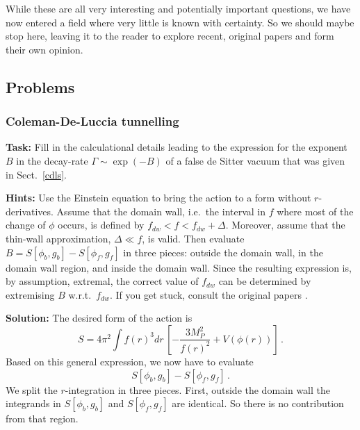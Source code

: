 \documentclass[12pt]{article}
\newcommand{\be}{\begin{equation}}
\newcommand{\ee}{\end{equation}}
\numberwithin{equation}{section}
\begin{document}
While these are all very interesting and potentially important questions, we have now entered a field where very little is known with certainty. So we should maybe stop here, leaving it to the reader to explore recent, original papers and form their own opinion.

\subsection{Problems}
\subsubsection{Coleman-De-Luccia tunnelling}\label{cdlp}

{\bf Task:} Fill in the calculational details leading to the expression for the exponent $B$ in the decay-rate $\Gamma\sim \exp(-B)$ of a false de Sitter vacuum that was given in Sect.~\ref{cdls}.

\noindent
{\bf Hints:} Use the Einstein equation to bring the action to a form without $r$-derivatives. Assume that the domain wall, i.e.~the interval in $f$ where most of the change of $\phi$ occurs, is defined by $f_{dw}<f<f_{dw}+\Delta$. Moreover, assume that the thin-wall approximation, $\Delta\ll f$, is valid. Then evaluate $B=S[\phi_b,g_b]-S[\phi_f,g_f]$ in three pieces: outside the  domain wall, in the domain wall region, and inside the domain wall. Since the resulting expression is, by assumption, extremal, the correct value of $f_{dw}$ can be determined by extremising $B$ w.r.t.~$f_{dw}$. If you get stuck, consult the original papers \cite{Coleman:1980aw, Parke:1982pm, Johnson:2007jla}.

\noindent
{\bf Solution:}
The desired form of the action is
\be
S = 4\pi^2 \int f(r)^3 dr\,\left[-\frac{3M_P^2}{f(r)^2}+V(\phi(r))\right]\,.
\ee
Based on this general expression, we now have to evaluate
\be
S[\phi_b,g_b]-S[\phi_f,g_f]\,.
\ee
We split the $r$-integration in three pieces. First, outside the domain wall the integrands in $S[\phi_b,g_b]$ and $S[\phi_f,g_f]$ are identical. So there is no contribution from that region. 
\end{document}
